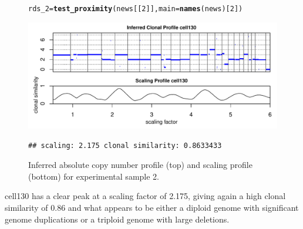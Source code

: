\documentclass[12pt]{article}\usepackage[]{graphicx}\usepackage[]{color}
\makeatletter
\newcommand{\hlnum}[1]{\textcolor[rgb]{0.686,0.059,0.569}{#1}}%
\newcommand{\hlstd}[1]{\textcolor[rgb]{0.345,0.345,0.345}{#1}}%
\newcommand{\hlkwb}[1]{\textcolor[rgb]{0.69,0.353,0.396}{#1}}%
\newcommand{\hlkwc}[1]{\textcolor[rgb]{0.333,0.667,0.333}{#1}}%
\newcommand{\hlkwd}[1]{\textcolor[rgb]{0.737,0.353,0.396}{\textbf{#1}}}%
\newenvironment{kframe}{%
 \def\at@end@of@kframe{}%
 \ifinner\ifhmode%
  \def\at@end@of@kframe{\end{minipage}}%
  \begin{minipage}{\columnwidth}%
 \fi\fi%
 \def\FrameCommand##1{\hskip\@totalleftmargin \hskip-\fboxsep
 \colorbox{shadecolor}{##1}\hskip-\fboxsep
     \hskip-\linewidth \hskip-\@totalleftmargin \hskip\columnwidth}%
 \MakeFramed {\advance\hsize-\width
   \@totalleftmargin\z@ \linewidth\hsize
   \@setminipage}}%
 {\par\unskip\endMakeFramed%
 \at@end@of@kframe}
\newenvironment{knitrout}{}{} %
\makeatother
\begin{document}
\begin{figure}[h!]
  \centering
\begin{knitrout}
\color{fgcolor}\begin{kframe}
\begin{alltt}
\hlstd{rds_2} \hlkwb{=} \hlkwd{test_proximity}\hlstd{(news[[}\hlnum{2}\hlstd{]],} \hlkwc{main} \hlstd{=} \hlkwd{names}\hlstd{(news)[}\hlnum{2}\hlstd{])}
\end{alltt}
\end{kframe}
\includegraphics[width=.95\linewidth]{figure/unnamed-chunk-16-1} 
\begin{kframe}\begin{verbatim}
## scaling: 2.175 clonal similarity: 0.8633433
\end{verbatim}
\end{kframe}
\end{knitrout}
\caption{Inferred absolute copy number profile (top) and scaling profile (bottom) for experimental sample 2.}
\label{fig:samp2}
\end{figure}

cell130 has a clear peak at a scaling factor of 2.175, giving again a high clonal similarity of 0.86 and what appears to be either a diploid genome with significant genome duplications or a triploid genome with large deletions.
\end{document}
